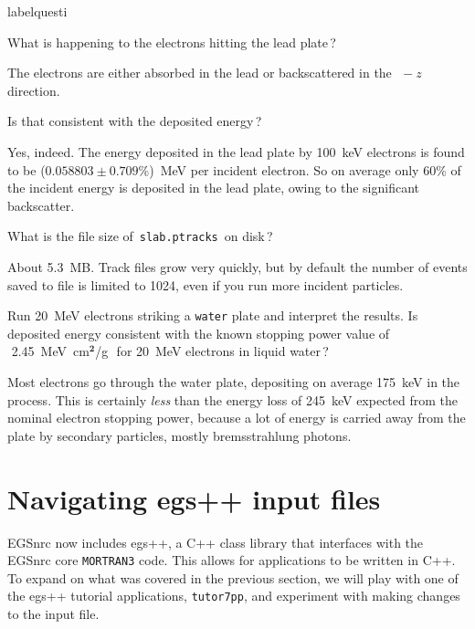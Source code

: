 \documentclass[12pt,twoside]{article}
\makeatletter
\renewcommand\thequesti         {\@arabic\c@questi}
\newenvironment{question}{
    \bfseries
    \edef\@questictr{questi}
    \expandafter
    \list \csname label\@questictr\endcsname {
        \usecounter\@questictr\def\makelabel##1{\hss\llap{##1}}
        \savebox{\questbox}             {\thequesti}
        \setlength\labelsep             {0.6em}
        \setlength\labelwidth           {\wd\questbox}
        \setlength\leftmargini          {\labelwidth}
        \addtolength{\leftmargini}      {\labelsep}
        \addtolength{\leftmargini}      {0.2em}
        \leftmargin\leftmargini
        \setlength\topsep               {1em}
        \setlength\itemsep              {1.2em}
        \setlength\parsep               {0.5em}
    }
}{\normalfont\endlist}
\newenvironment{answer}{\normalfont}{\relax}
\makeatother
\begin{document}
\begin{question}

\item What is happening to the electrons hitting the lead plate\,?

\begin{answer}
The electrons are either absorbed in the lead or backscattered
in the $\,\,-z$ direction.
\end{answer}

\item Is that consistent with the deposited energy\,?

\begin{answer}
Yes, indeed. The energy deposited in the lead plate by 100~keV electrons
is found to be ($0.058803 \pm 0.709$\%)~MeV per incident electron. So on
average only 60\% of the incident energy is deposited in the lead plate,
owing to the significant backscatter.
\end{answer}

\item What is the file size of \,\Verb|slab.ptracks|\, on disk\,?

\begin{answer}
About 5.3~MB. Track files grow very quickly, but by default the number
of events saved to file is limited to 1024, even if you run more
incident particles.
\end{answer}

\item Run 20~MeV electrons striking a \Verb|water| plate
and interpret the results. Is deposited energy consistent with the known
stopping power value of \\
\,\,2.45~MeV~cm$\mathbf{^2}$\!/g\,\, for 20~MeV
electrons in liquid water\,?

\begin{answer}
Most electrons go through the water plate, depositing on average
175~keV in the process. This is certainly \textit{less} than the
energy loss of 245~keV expected from the nominal electron stopping
power, because a lot of energy is carried away from the plate by
secondary particles, mostly bremsstrahlung photons.
\end{answer}

\end{question}

\clearpage
\section{Navigating egs++ input files}
EGSnrc now includes egs++, a C++ class library that interfaces with the EGSnrc core \Verb+MORTRAN3+ code. This allows for applications to be written in C++. To expand on what was covered in the previous section, we will play with one of the egs++ tutorial applications, \Verb+tutor7pp+, and experiment with making changes to the input file.
\end{document}
